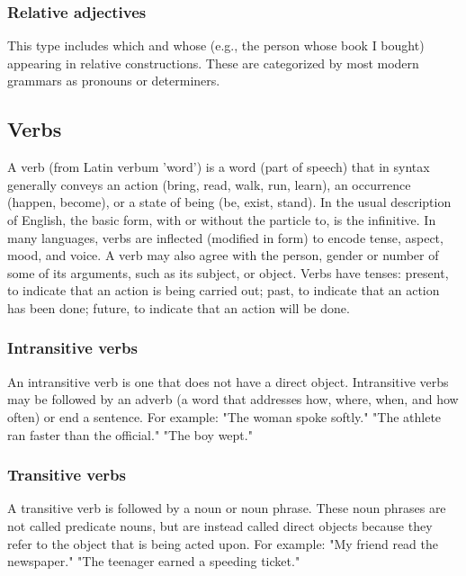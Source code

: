 \subsubsection{Relative adjectives \cite{wiki-eng-adjective}}

This type includes which and whose (e.g., the person whose book I bought) appearing in relative constructions. These are categorized by most modern grammars as pronouns or determiners.




\subsection{Verbs \cite{wiki-verb,wiki-eng-verb}}
A verb (from Latin verbum 'word') is a word (part of speech) that in syntax generally conveys an action (bring, read, walk, run, learn), an occurrence (happen, become), or a state of being (be, exist, stand). In the usual description of English, the basic form, with or without the particle to, is the infinitive. In many languages, verbs are inflected (modified in form) to encode tense, aspect, mood, and voice. A verb may also agree with the person, gender or number of some of its arguments, such as its subject, or object. Verbs have tenses: present, to indicate that an action is being carried out; past, to indicate that an action has been done; future, to indicate that an action will be done.

\subsubsection{Intransitive verbs \cite{wiki-verb}}
An intransitive verb is one that does not have a direct object. Intransitive verbs may be followed by an adverb (a word that addresses how, where, when, and how often) or end a sentence. For example: "The woman spoke softly." "The athlete ran faster than the official." "The boy wept."

\subsubsection{Transitive verbs \cite{wiki-verb}}
A transitive verb is followed by a noun or noun phrase. These noun phrases are not called predicate nouns, but are instead called direct objects because they refer to the object that is being acted upon. For example: "My friend read the newspaper." "The teenager earned a speeding ticket." \\

